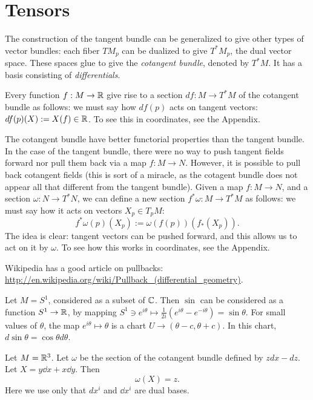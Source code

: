 \documentclass[11pt, english]{article}
\begin{document}
\newpage
\section{Tensors}

The construction of the tangent bundle can be generalized to give other types of vector bundles: each fiber $TM_p$ can be dualized to give $T^\ast M_p$, the dual vector space. These spaces glue to give the \emph{cotangent bundle}, denoted by $T^\ast M$. It has a basis consisting of \emph{differentials}.

Every function $f:M \to \mathbb{R}$ give rise to a section $df:M \to T^\ast M$ of the cotangent bundle as follows: we must say how $df(p)$ acts on tangent vectors: $df(p)(X) := X(f) \in \mathbb{R}$. To see this in coordinates, see the Appendix.

The cotangent bundle have better functorial properties than the tangent bundle. In the case of the tangent bundle, there were no way to push tangent fields forward nor pull them back via a map $f:M \to N$. However, it is possible to pull back cotangent fields (this is sort of a miracle, as the cotagent bundle does not appear all that different from the tangent bundle). Given a map $f:M \to N$, and a section $\omega:N \to T^\ast N$, we can define a new section $f^\ast \omega:M \to T^\ast M$ as follows: we must say how it acts on vectors $X_p \in T_pM$:
\[
f^\ast \omega(p)(X_p) := \omega(f(p))(f_\ast(X_p)).
\]
The idea is clear: tangent vectors can be pushed forward, and this allows us to act on it by $\omega$.  To see how this works in coordinates, see the Appendix.

Wikipedia has a good article on pullbacks: \url{http://en.wikipedia.org/wiki/Pullback_(differential_geometry)}. 

\begin{example}
Let $M=S^1$, considered as a subset of $\mathbb{C}$. Then $\sin$ can be considered as a function $S^1 \to \mathbb{R}$, by mapping $S^1 \ni e^{i\theta} \mapsto \frac{1}{2i}(e^{i\theta}-e^{-i\theta})=\sin \theta$. For small values of $\theta$, the map $e^{i\theta} \mapsto \theta$ is a chart $U \to (\theta-c,\theta+c)$. In this chart, $d\sin \theta = \cos \theta d\theta$.
\end{example}

\begin{example}
Let $M=\mathbb{R}^3$. Let $\omega$ be the section of the cotangent bundle defined by $z dx-dz$. Let $X=y \dd{}{x}+x \dd{}{y}$. Then 
\[
\omega(X) = z.
\]
Here we use only that $dx^i$ and $\dd{}{x^i}$ are dual bases.
\end{example}
 
\end{document}

